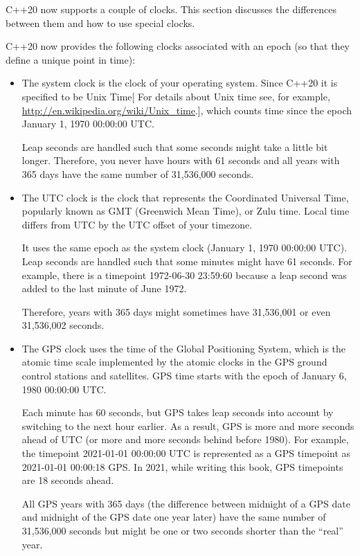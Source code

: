 
C++20 now supports a couple of clocks. This section discusses the differences between them and how to use special clocks.


C++20 now provides the following clocks associated with an epoch (so that they define a unique point in time):

\begin{itemize}
\item 
The system clock is the clock of your operating system. Since C++20 it is specified to be Unix Time[ For details about Unix time see, for example, \url{http://en.wikipedia.org/wiki/Unix_time}.], which counts time since the epoch January 1, 1970 00:00:00 UTC.

Leap seconds are handled such that some seconds might take a little bit longer. Therefore, you never have hours with 61 seconds and all years with 365 days have the same number of 31,536,000 seconds.

\item
The UTC clock is the clock that represents the Coordinated Universal Time, popularly known as GMT (Greenwich Mean Time), or Zulu time. Local time differs from UTC by the UTC offset of your timezone.

It uses the same epoch as the system clock (January 1, 1970 00:00:00 UTC).
Leap seconds are handled such that some minutes might have 61 seconds. For example, there is a timepoint 1972-06-30 23:59:60 because a leap second was added to the last minute of June 1972.

Therefore, years with 365 days might sometimes have 31,536,001 or even 31,536,002 seconds.

\item
The GPS clock uses the time of the Global Positioning System, which is the atomic time scale implemented by the atomic clocks in the GPS ground control stations and satellites. GPS time starts with the epoch of January 6, 1980 00:00:00 UTC.

Each minute has 60 seconds, but GPS takes leap seconds into account by switching to the next hour earlier. As a result, GPS is more and more seconds ahead of UTC (or more and more seconds behind before 1980). For example, the timepoint 2021-01-01 00:00:00 UTC is represented as a GPS timepoint as 2021-01-01 00:00:18 GPS. In 2021, while writing this book, GPS timepoints are 18 seconds ahead.

All GPS years with 365 days (the difference between midnight of a GPS date and midnight of the GPS date one year later) have the same number of 31,536,000 seconds but might be one or two seconds shorter than the “real” year.


\end{itemize}
